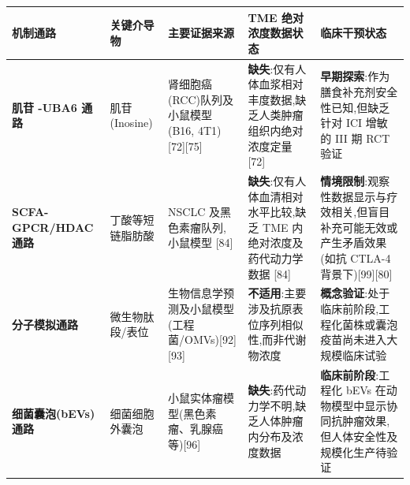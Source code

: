 {\def\LTcaptype{none} %
\begin{longtable}[]{@{}
  >{\raggedright\arraybackslash}p{}
  >{\raggedright\arraybackslash}p{}
  >{\raggedright\arraybackslash}p{}
  >{\raggedright\arraybackslash}p{}
  >{\raggedright\arraybackslash}p{}@{}}
\toprule\noalign{}
\begin{minipage}[b]{\linewidth}\raggedright
机制通路
\end{minipage} & \begin{minipage}[b]{\linewidth}\raggedright
关键介导物
\end{minipage} & \begin{minipage}[b]{\linewidth}\raggedright
主要证据来源
\end{minipage} & \begin{minipage}[b]{\linewidth}\raggedright
TME 绝对浓度数据状态
\end{minipage} & \begin{minipage}[b]{\linewidth}\raggedright
临床干预状态
\end{minipage} \\
\midrule\noalign{}
\endhead
\bottomrule\noalign{}
\endlastfoot
\textbf{肌苷 -UBA6 通路} & 肌苷(Inosine) & 肾细胞癌(RCC)队列及小鼠模型(B16, 4T1){[}72{]}{[}75{]} & \textbf{缺失}:仅有人体血浆相对丰度数据,缺乏人类肿瘤组织内绝对浓度定量 {[}72{]} & \textbf{早期探索}:作为膳食补充剂安全性已知,但缺乏针对 ICI 增敏的 III 期 RCT 验证 \\
\textbf{SCFA-GPCR/HDAC 通路} & 丁酸等短链脂肪酸 & NSCLC 及黑色素瘤队列,小鼠模型 {[}84{]} & \textbf{缺失}:仅有人体血清相对水平比较,缺乏 TME 内绝对浓度及药代动力学数据 {[}84{]} & \textbf{情境限制}:观察性数据显示与疗效相关,但盲目补充可能无效或产生矛盾效果(如抗 CTLA-4 背景下){[}99{]}{[}80{]} \\
\textbf{分子模拟通路} & 微生物肽段/表位 & 生物信息学预测及小鼠模型(工程菌/OMVs){[}92{]}{[}93{]} & \textbf{不适用}:主要涉及抗原表位序列相似性,而非代谢物浓度 & \textbf{概念验证}:处于临床前阶段,工程化菌株或囊泡疫苗尚未进入大规模临床试验 \\
\textbf{细菌囊泡(bEVs)通路} & 细菌细胞外囊泡 & 小鼠实体瘤模型(黑色素瘤、乳腺癌等){[}96{]} & \textbf{缺失}:药代动力学不明,缺乏人体肿瘤内分布及浓度数据 & \textbf{临床前阶段}:工程化 bEVs 在动物模型中显示协同抗肿瘤效果,但人体安全性及规模化生产待验证 \\
\end{longtable}
}

